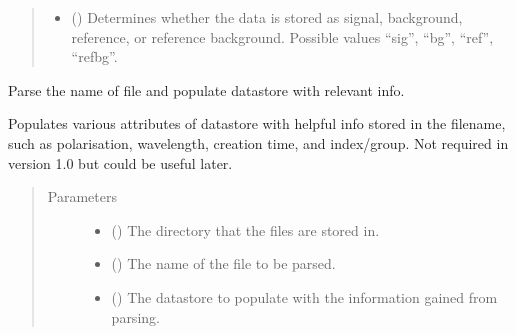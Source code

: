 \documentclass[a4paper,10pt,english]{sphinxmanual}
\begin{document}
\begin{fulllineitems}
\begin{fulllineitems}
\begin{quote}
\begin{description}
\begin{itemize}
\item {} 
\sphinxAtStartPar
{} () \textendash{} Determines whether the data is stored as signal, background, reference, or reference
background. Possible values “sig”, “bg”, “ref”, “refbg”.

\end{itemize}

\end{description}\end{quote}

\end{fulllineitems}


\begin{fulllineitems}
\label{\detokenize{sfgtools:sfgtools.SFGProcessTools.parse_filename}}
\sphinxAtStartPar
Parse the name of file and populate datastore with relevant info.

\sphinxAtStartPar
Populates various attributes of datastore with helpful info stored in the filename,
such as polarisation, wavelength, creation time, and index/group. Not required in version 1.0 but
could be useful later.
\begin{quote}\begin{description}
\item[{Parameters}] \leavevmode\begin{itemize}
\item {} 
\sphinxAtStartPar
{} () \textendash{} The directory that the files are stored in.

\item {} 
\sphinxAtStartPar
{} () \textendash{} The name of the file to be parsed.

\item {} 
\sphinxAtStartPar
{} () \textendash{} The datastore to populate with the information gained from parsing.


\end{itemize}
\end{description}
\end{quote}
\end{fulllineitems}
\end{fulllineitems}
\end{document}
